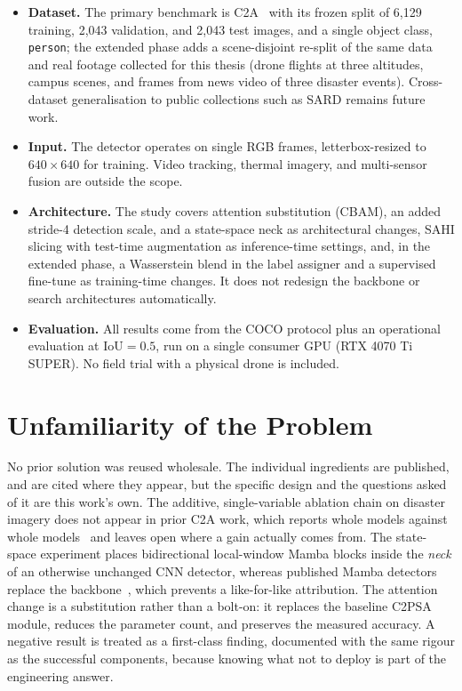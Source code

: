 \documentclass[12pt,a4paper,oneside]{report}
\begin{document}
\begin{itemize}
  \item \textbf{Dataset.} The primary benchmark is C2A~\cite{nihal2024c2a}
        with its frozen split of 6{,}129 training, 2{,}043 validation, and
        2{,}043 test images, and a single object class, \texttt{person}; the
        extended phase adds a scene-disjoint re-split of the same data and
        real footage collected for this thesis (drone flights at three
        altitudes, campus scenes, and frames from news video of three
        disaster events). Cross-dataset generalisation to public collections
        such as SARD remains future work.
  \item \textbf{Input.} The detector operates on single RGB frames,
        letterbox-resized to $640 \times 640$ for training. Video tracking,
        thermal imagery, and multi-sensor fusion are outside the scope.
  \item \textbf{Architecture.} The study covers attention substitution
        (CBAM), an added stride-4 detection scale, and a state-space neck as
        architectural changes, SAHI slicing with test-time augmentation as
        inference-time settings, and, in the extended phase, a Wasserstein
        blend in the label assigner and a supervised fine-tune as
        training-time changes. It does not redesign the backbone or search
        architectures automatically.
  \item \textbf{Evaluation.} All results come from the COCO protocol plus an
        operational evaluation at $\mathrm{IoU} = 0.5$, run on a single
        consumer GPU (RTX 4070 Ti SUPER). No field trial with a physical
        drone is included.
\end{itemize}

\section{Unfamiliarity of the Problem}
No prior solution was reused wholesale. The individual ingredients are
published, and are cited where they appear, but the specific design and the
questions asked of it are this work's own. The additive, single-variable
ablation chain on disaster imagery does not appear in prior C2A work, which
reports whole models against whole models~\cite{nihal2024c2a} and leaves open
where a gain actually comes from. The state-space experiment places
bidirectional local-window Mamba blocks inside the \emph{neck} of an
otherwise unchanged CNN detector, whereas published Mamba detectors replace
the backbone~\cite{wang2025mambayolo}, which prevents a like-for-like
attribution. The attention change is a substitution rather than a bolt-on: it
replaces the baseline C2PSA module, reduces the parameter count, and preserves
the measured accuracy. A negative result is treated as a first-class finding,
documented with
the same rigour as the successful components, because knowing what not to
deploy is part of the engineering answer.
\end{document}
